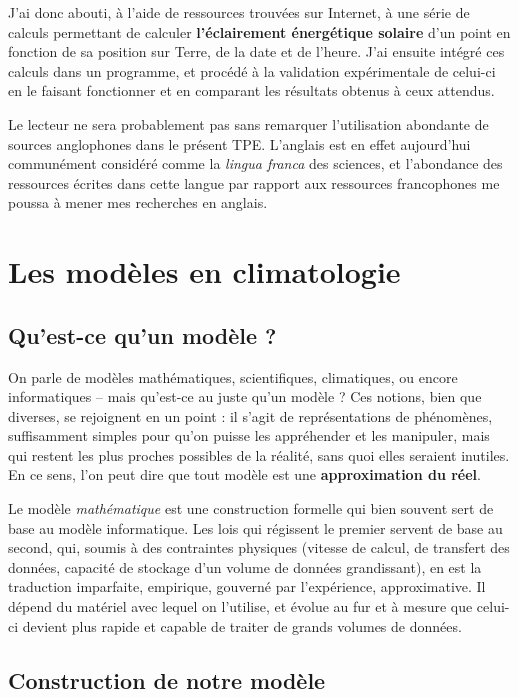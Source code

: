 \documentclass[12pt]{article}
\begin{document}
J'ai donc abouti, à l'aide de ressources trouvées sur Internet, à une série de calculs permettant de calculer \textbf{l'éclairement énergétique solaire} d'un point en fonction de sa position sur Terre, de la date et de l'heure.
J'ai ensuite intégré ces calculs dans un programme, et procédé à la validation expérimentale de celui-ci en le faisant fonctionner et en comparant les résultats obtenus à ceux attendus.

Le lecteur ne sera probablement pas sans remarquer l'utilisation abondante de sources anglophones dans le présent TPE. L'anglais est en effet aujourd'hui communément considéré comme la \textit{lingua franca} \cite{english_lingua_franca} des sciences, et l'abondance des ressources écrites dans cette langue par rapport aux ressources francophones me poussa à mener mes recherches en anglais. 


\clearpage
\section{Les modèles en climatologie} %

\subsection{Qu'est-ce qu'un modèle ?}

On parle de modèles mathématiques, scientifiques, climatiques, ou encore informatiques -- mais qu'est-ce au juste qu'un modèle ?
Ces notions, bien que diverses, se rejoignent en un point : il s'agit de représentations de phénomènes, suffisamment simples pour qu'on puisse les appréhender et les manipuler, mais qui restent les plus proches possibles de la réalité, sans quoi elles seraient inutiles.
En ce sens, l'on peut dire que tout modèle est une \textbf{approximation du réel}.

Le modèle \emph{mathématique} est une construction formelle qui bien souvent sert de base au modèle informatique.
Les lois qui régissent le premier servent de base au second, qui, soumis à des contraintes physiques (vitesse de calcul, de transfert des données, capacité de stockage d'un volume de données grandissant), en est la traduction imparfaite, empirique, gouverné par l'expérience, approximative.
Il dépend du matériel avec lequel on l'utilise, et évolue au fur et à mesure que celui-ci devient plus rapide et capable de traiter de grands volumes de données.

\subsection{Construction de notre modèle}
\end{document}
